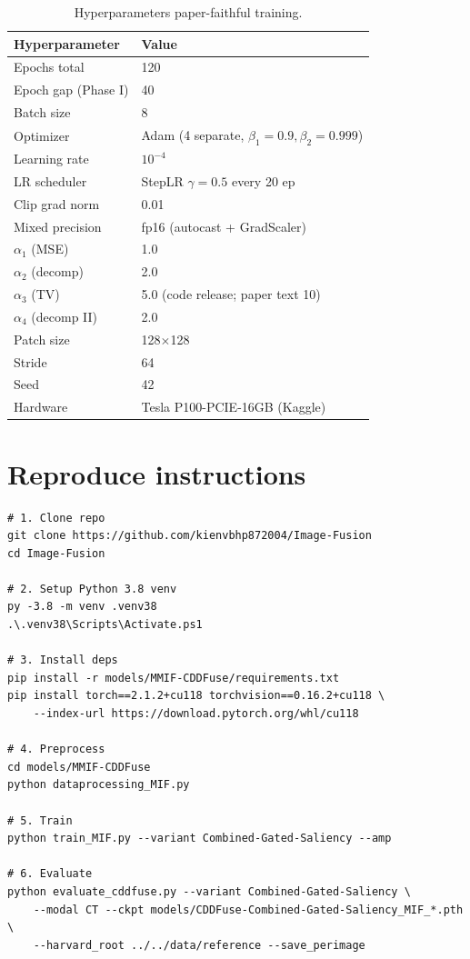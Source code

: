 \begin{table}[h]
\centering
\caption{Hyperparameters paper-faithful training.}
\begin{tabular}{ll}
\toprule
Hyperparameter & Value \\
\midrule
Epochs total          & 120 \\
Epoch gap (Phase I)   & 40 \\
Batch size            & 8 \\
Optimizer             & Adam (4 separate, $\beta_1=0.9, \beta_2=0.999$) \\
Learning rate         & $10^{-4}$ \\
LR scheduler          & StepLR $\gamma=0.5$ every 20 ep \\
Clip grad norm        & 0.01 \\
Mixed precision       & fp16 (autocast + GradScaler) \\
$\alpha_1$ (MSE)      & 1.0 \\
$\alpha_2$ (decomp)   & 2.0 \\
$\alpha_3$ (TV)       & 5.0 (code release; paper text 10) \\
$\alpha_4$ (decomp II)& 2.0 \\
Patch size            & 128$\times$128 \\
Stride                & 64 \\
Seed                  & 42 \\
Hardware              & Tesla P100-PCIE-16GB (Kaggle) \\
\bottomrule
\end{tabular}
\end{table}

\section{Reproduce instructions}
\label{app:reproduce}

\begin{verbatim}
# 1. Clone repo
git clone https://github.com/kienvbhp872004/Image-Fusion
cd Image-Fusion

# 2. Setup Python 3.8 venv
py -3.8 -m venv .venv38
.\.venv38\Scripts\Activate.ps1

# 3. Install deps
pip install -r models/MMIF-CDDFuse/requirements.txt
pip install torch==2.1.2+cu118 torchvision==0.16.2+cu118 \
    --index-url https://download.pytorch.org/whl/cu118

# 4. Preprocess
cd models/MMIF-CDDFuse
python dataprocessing_MIF.py

# 5. Train
python train_MIF.py --variant Combined-Gated-Saliency --amp

# 6. Evaluate
python evaluate_cddfuse.py --variant Combined-Gated-Saliency \
    --modal CT --ckpt models/CDDFuse-Combined-Gated-Saliency_MIF_*.pth \
    --harvard_root ../../data/reference --save_perimage
\end{verbatim}
